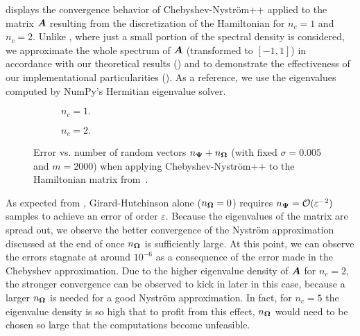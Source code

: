  displays the convergence behavior of Chebyshev-Nyström++ applied to the matrix $\boldsymbol{A}$ resulting from the discretization of the Hamiltonian for $n_c = 1$ and $n_c = 2$. Unlike \cite{lin-2017-randomized-estimation}, where just a small portion of the spectral density is considered, we approximate the whole spectrum of $\boldsymbol{A}$ (transformed to $[-1, 1]$) in accordance with our theoretical results () and to demonstrate the effectiveness of our implementational particularities (). As a reference, we use the eigenvalues computed by NumPy's Hermitian eigenvalue solver.
\begin{figure}[ht]
    \centering
    \begin{subfigure}[b]{0.495\textwidth}
        
        \caption{$n_c = 1.$}
        \label{fig:convergence-1}
    \end{subfigure}
    \begin{subfigure}[b]{0.495\textwidth}
        
        \caption{$n_c = 2.$}
        \label{fig:convergence-2}
    \end{subfigure}
    \caption{Error vs. number of random vectors $n_{\boldsymbol{\Psi}} + n_{\boldsymbol{\Omega}}$ (with fixed $\sigma=0.005$ and $m=2000$) when applying  Chebyshev-Nyström++ to the Hamiltonian matrix from~.}
    \label{fig:convergence}
\end{figure}%
%    
As expected from , Girard-Hutchinson alone ($n_{\boldsymbol{\Omega}} = 0$) requires $n_{\boldsymbol{\Psi}} = \mathcal{O}(\varepsilon^{-2})$ samples to achieve an error of order $\varepsilon$. Because the eigenvalues of the matrix are spread out, we observe the better convergence of the Nyström approximation discussed at the end of  once $n_{\boldsymbol{\Omega}}$ is sufficiently large. At this point, we can observe the errors stagnate at around $10^{-6}$ as a consequence of the error made in the Chebyshev approximation. Due to the higher eigenvalue density of $\boldsymbol{A}$ for $n_c = 2$, the stronger convergence can be observed to kick in later in this case, because a larger $n_{\boldsymbol{\Omega}}$ is needed for a good Nyström approximation. In fact, for $n_c = 5$ the eigenvalue density is so high that to profit from this effect, $n_{\boldsymbol{\Omega}}$ would need to be chosen so large that the computations become unfeasible.

